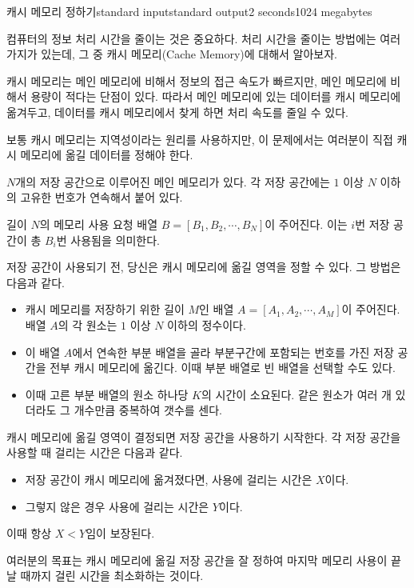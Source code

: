 \begin{problem}{캐시 메모리 정하기}{standard input}{standard output}{2 seconds}{1024 megabytes}

컴퓨터의 정보 처리 시간을 줄이는 것은 중요하다. 처리 시간을 줄이는 방법에는 여러 가지가 있는데, 그 중 캐시 메모리(Cache Memory)에 대해서 알아보자.

캐시 메모리는 메인 메모리에 비해서 정보의 접근 속도가 빠르지만, 메인 메모리에 비해서 용량이 적다는 단점이 있다. 따라서 메인 메모리에 있는 데이터를 캐시 메모리에 옮겨두고, 데이터를 캐시 메모리에서 찾게 하면 처리 속도를 줄일 수 있다.

보통 캐시 메모리는 지역성이라는 원리를 사용하지만, 이 문제에서는 여러분이 직접 캐시 메모리에 옮길 데이터를 정해야 한다.

$N$개의 저장 공간으로 이루어진 메인 메모리가 있다. 각 저장 공간에는 $1$ 이상 $N$ 이하의 고유한 번호가 연속해서 붙어 있다.

길이 $N$의 메모리 사용 요청 배열 $B=[B_1, B_2, \cdots, B_N]$이 주어진다. 이는 $i$번 저장 공간이 총 $B_i$번 사용됨을 의미한다.

저장 공간이 사용되기 전, 당신은 캐시 메모리에 옮길 영역을 정할 수 있다. 그 방법은 다음과 같다.
\begin {itemize}
\item 캐시 메모리를 저장하기 위한 길이 $M$인 배열 $A=[A_1, A_2, \cdots, A_M]$이 주어진다. 배열 $A$의 각 원소는 $1$ 이상 $N$ 이하의 정수이다.
\item 이 배열 $A$에서 연속한 부분 배열을 골라 부분구간에 포함되는 번호를 가진 저장 공간을 전부 캐시 메모리에 옮긴다. 이때 부분 배열로 빈 배열을 선택할 수도 있다.
\item 이때 고른 부분 배열의 원소 하나당 $K$의 시간이 소요된다. 같은 원소가 여러 개 있더라도 그 개수만큼 중복하여 갯수를 센다.
\end{itemize}

캐시 메모리에 옮길 영역이 결정되면 저장 공간을 사용하기 시작한다. 각 저장 공간을 사용할 때 걸리는 시간은 다음과 같다.
\begin{itemize}
\item 저장 공간이 캐시 메모리에 옮겨졌다면, 사용에 걸리는 시간은 $X$이다.
\item 그렇지 않은 경우 사용에 걸리는 시간은 $Y$이다.
\end{itemize}

이때 항상 $X < Y$임이 보장된다.

여러분의 목표는 캐시 메모리에 옮길 저장 공간을 잘 정하여 마지막 메모리 사용이 끝날 때까지 걸린 시간을 최소화하는 것이다.


\end{problem}
